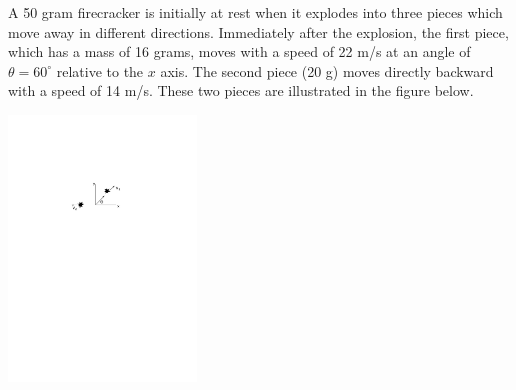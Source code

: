 \question[20] A 50 gram firecracker is initially at rest when it explodes into three pieces which move away in different directions. Immediately after the explosion, the first piece, which has a mass of 16 grams, moves with a speed of 22 m/s at an angle of $\theta=60^\circ$ relative to the $x$ axis. The second piece (20 g) moves directly backward with a speed of 14 m/s. These two pieces are illustrated in the figure below.

\begin{center}
	\includegraphics[width=5cm]{explosion.pdf}
\end{center}

